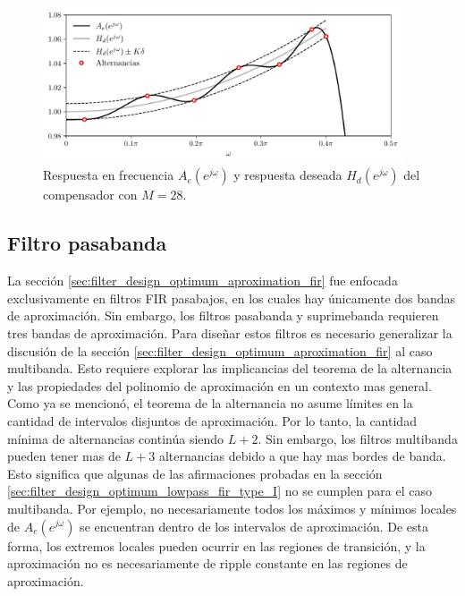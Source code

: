 \documentclass[a4paper]{report}
\begin{document}
\begin{figure}[!htb]
 \begin{center}
 \includegraphics[width=0.95\textwidth]{figuras/filter_design_fir_optimal_pm_zero_order_hold_Ae_passband.pdf}
 \caption{\label{fig:filter_design_fir_optimal_pm_zero_order_hold_Ae_passband} Respuesta en frecuencia \(A_e(e^{j\omega})\) y respuesta deseada \(H_d(e^{j\omega})\) del compensador con \(M=28\).}
 \end{center}
\end{figure}

\subsection{Filtro pasabanda}

La sección \ref{sec:filter_design_optimum_aproximation_fir} fue enfocada exclusivamente en filtros FIR pasabajos, en los cuales hay únicamente dos bandas de aproximación. Sin embargo, los filtros pasabanda y suprimebanda requieren tres bandas de aproximación. Para diseñar estos filtros es necesario generalizar la discusión de la sección \ref{sec:filter_design_optimum_aproximation_fir} al caso multibanda. Esto requiere explorar las implicancias del teorema de la alternancia y las propiedades del polinomio de aproximación en un contexto mas general. Como ya se mencionó, el teorema de la alternancia no asume límites en la cantidad de intervalos disjuntos de aproximación. Por lo tanto, la cantidad mínima de alternancias continúa siendo \(L+2\). Sin embargo, los filtros multibanda pueden tener mas de \(L+3\) alternancias debido a que hay mas bordes de banda. Esto significa que algunas de las afirmaciones probadas en la sección \ref{sec:filter_design_optimum_lowpass_fir_type_I} no se cumplen para el caso multibanda. Por ejemplo, no necesariamente todos los máximos y mínimos locales de \(A_e(e^{j\omega})\) se encuentran dentro de los intervalos de aproximación. De esta forma, los extremos locales pueden ocurrir en las regiones de transición, y la aproximación no es necesariamente de ripple constante en las regiones de aproximación.
\end{document}

